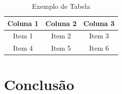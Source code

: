 \documentclass[12pt,openright,twoside,a4paper,brazil]{abntex2}
\begin{document}
\begin{table}[ht]
\centering
\begin{tabular}{|c|c|c|}
\hline
Coluna 1 & Coluna 2 & Coluna 3 \\ \hline
Item 1   & Item 2   & Item 3   \\ \hline
Item 4   & Item 5   & Item 6   \\ \hline
\end{tabular}
\caption{Exemplo de Tabela}
\label{tab:exemplo}
\end{table}

\chapter{Conclusão}
\lipsum[11-12]


\end{document}
